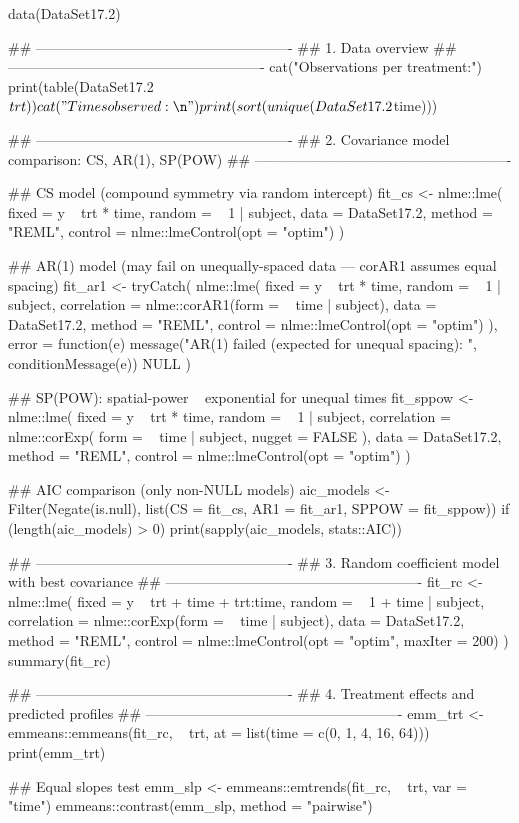 \documentclass[a4paper]{book}
\begin{document}
%
\begin{Examples}
\begin{ExampleCode}
data(DataSet17.2)

## -------------------------------------------------------
## 1. Data overview
## -------------------------------------------------------
cat("Observations per treatment:\n")
print(table(DataSet17.2$trt))
cat("Times observed:\n")
print(sort(unique(DataSet17.2$time)))

## -------------------------------------------------------
## 2. Covariance model comparison: CS, AR(1), SP(POW)
## -------------------------------------------------------

## CS model (compound symmetry via random intercept)
fit_cs <- nlme::lme(
  fixed  = y ~ trt * time,
  random = ~ 1 | subject,
  data   = DataSet17.2,
  method = "REML",
  control = nlme::lmeControl(opt = "optim")
)

## AR(1) model (may fail on unequally-spaced data — corAR1 assumes equal spacing)
fit_ar1 <- tryCatch(
  nlme::lme(
    fixed       = y ~ trt * time,
    random      = ~ 1 | subject,
    correlation = nlme::corAR1(form = ~ time | subject),
    data        = DataSet17.2,
    method      = "REML",
    control     = nlme::lmeControl(opt = "optim")
  ),
  error = function(e) {
    message("AR(1) failed (expected for unequal spacing): ", conditionMessage(e))
    NULL
  }
)

## SP(POW): spatial-power ~ exponential for unequal times
fit_sppow <- nlme::lme(
  fixed       = y ~ trt * time,
  random      = ~ 1 | subject,
  correlation = nlme::corExp(
    form   = ~ time | subject,
    nugget = FALSE
  ),
  data        = DataSet17.2,
  method      = "REML",
  control     = nlme::lmeControl(opt = "optim")
)

## AIC comparison (only non-NULL models)
aic_models <- Filter(Negate(is.null), list(CS = fit_cs, AR1 = fit_ar1, SPPOW = fit_sppow))
if (length(aic_models) > 0) print(sapply(aic_models, stats::AIC))

## -------------------------------------------------------
## 3. Random coefficient model with best covariance
## -------------------------------------------------------
fit_rc <- nlme::lme(
  fixed       = y ~ trt + time + trt:time,
  random      = ~ 1 + time | subject,
  correlation = nlme::corExp(form = ~ time | subject),
  data        = DataSet17.2,
  method      = "REML",
  control     = nlme::lmeControl(opt = "optim", maxIter = 200)
)
summary(fit_rc)

## -------------------------------------------------------
## 4. Treatment effects and predicted profiles
## -------------------------------------------------------
emm_trt <- emmeans::emmeans(fit_rc, ~ trt,
                             at = list(time = c(0, 1, 4, 16, 64)))
print(emm_trt)

## Equal slopes test
emm_slp <- emmeans::emtrends(fit_rc, ~ trt, var = "time")
emmeans::contrast(emm_slp, method = "pairwise")
\end{ExampleCode}
\end{Examples}
\end{document}
